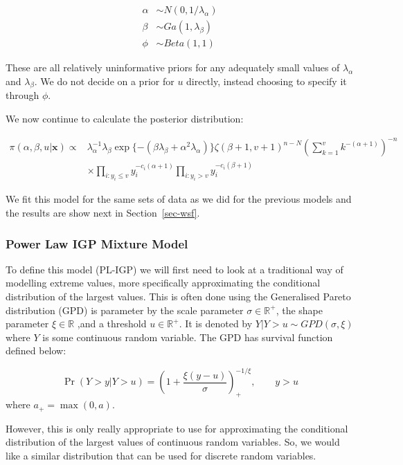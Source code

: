 \documentclass[
]{article}
\begin{document}
\begin{align*}
\alpha &\sim N(0,1/\lambda_\alpha)\\
\beta &\sim Ga(1,\lambda_\beta)\\
\phi &\sim Beta(1,1)
\end{align*}

These are all relatively uninformative priors for any adequately small
values of \(\lambda_\alpha\) and \(\lambda_\beta\). We do not decide on
a prior for \(u\) directly, instead choosing to specify it through
\(\phi\).

We now continue to calculate the posterior distribution:

\begin{align*}
\pi(\alpha, \beta, u|\boldsymbol{x}) \propto &\lambda_\alpha^{-1}\lambda_\beta\exp\{-(\beta\lambda_\beta + \alpha^2\lambda_\alpha)\}\zeta(\beta+1, v+1)^{n-N}\left(\sum_{k=1}^v k^{-(\alpha+1)}\right)^{-n}\\&\times\prod_{i:y_i\le v}y_i^{-c_i(\alpha+1)}\prod_{i:y_i>v}y_i^{-c_i(\beta+1)}
%
\end{align*}

We fit this model for the same sets of data as we did for the previous
models and the results are show next in Section~\ref{sec-wsf}.

\subsubsection{Power Law IGP Mixture Model}\label{sec-pli}

To define this model (PL-IGP) we will first need to look at a
traditional way of modelling extreme values, more specifically
approximating the conditional distribution of the largest values. This
is often done using the Generalised Pareto distribution (GPD) is
parameter by the scale parameter \(\sigma\in \mathbb{R}^+\), the shape
parameter \(\xi \in \mathbb{R}\) ,and a threshold \(u\in \mathbb{R}^+\).
It is denoted by \(Y|Y>u \sim GPD(\sigma,\xi)\) where \(Y\) is some
continuous random variable. The GPD has survival function defined below:

\[
\Pr(Y>y|Y>u) = \left(1+\frac{\xi(y-u)}{\sigma}\right)_+^{-1/\xi}, \qquad y>u
\] where \(a_+ = \max(0,a)\).

However, this is only really appropriate to use for approximating the
conditional distribution of the largest values of continuous random
variables. So, we would like a similar distribution that can be used for
discrete random variables.
\end{document}

